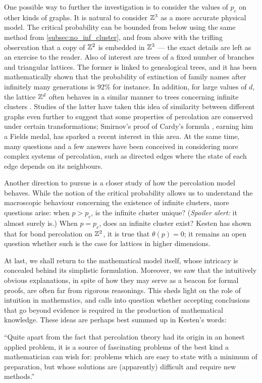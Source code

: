 \documentclass[a4paper, 12pt]{article}
\begin{document}
One possible way to further the investigation is to consider the values of $p_c$ on other kinds of graphs. It is natural to consider $\mathbb{Z}^3$ as a more accurate physical model. The critical probability can be bounded from below using the same method from \cref{subsec:no_inf_cluster}, and from above with the trifling observation that a copy of $\mathbb{Z}^2$ is embedded in $\mathbb{Z}^3$ --- the exact details are left as an exercise to the reader. Also of interest are trees of a fixed number of branches and triangular lattices. The former is linked to genealogical trees, and it has been mathematically shown that the probability of extinction of family names after infinitely many generations is $92\%$ \autocite[]{gennes_2000} for instance. In addition, for large values of $d$, the lattice $\mathbb{Z}^d$ often behaves in a similar manner to trees concerning infinite clusters \autocite[]{gennes_2000}. Studies of the latter have taken this idea of similarity between different graphs even further to suggest that some properties of percolation are conserved under certain transformations; Smirnov's proof of Cardy's formula \autocite*[1]{smirnov_2001}, earning him a Fields medal, has sparked a recent interest in this area. At the same time, many questions and a few answers have been conceived in considering more complex systems of percolation, such as directed edges where the state of each edge depends on its neighbours.

Another direction to pursue is a closer study of how the percolation model behaves. While the notion of the critical probability allows us to understand the macroscopic behaviour concerning the existence of infinite clusters, more questions arise: when $p > p_c$, is the infinite cluster unique? (\textit{Spoiler alert:} it almost surely is.) When $p = p_c$, does an infinite cluster exist? Kesten \autocite*[42]{kesten_1980} has shown that for bond percolation on $\mathbb{Z}^2$, it is true that $\theta(p) = 0$; it remains an open question whether such is the case for lattices in higher dimensions.

At last, we shall return to the mathematical model itself, whose intricacy is concealed behind its simplistic formulation. Moreover, we saw that the intuitively obvious explanations, in spite of how they may serve as a beacon for formal proofs, are often far from rigorous reasonings. This sheds light on the role of intuition in mathematics, and calls into question whether accepting conclusions that go beyond evidence is required in the production of mathematical knowledge. These ideas are perhaps best summed up in Kesten's words:

\begin{displayquote}
``Quite apart from the fact that percolation theory had its origin in an honest applied problem, it is a source of fascinating problems of the best kind a mathematician can wish for: problems which are easy to state with a minimum of preparation, but whose solutions are (apparently) difficult and require new methods.''
\end{displayquote}

\printbibliography
\end{document}
